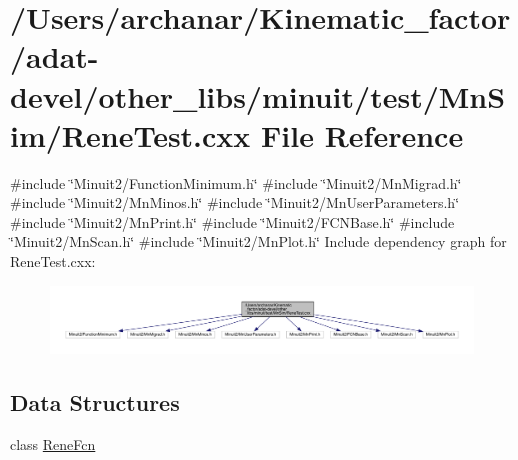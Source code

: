 \hypertarget{adat-devel_2other__libs_2minuit_2test_2MnSim_2ReneTest_8cxx}{}\section{/\+Users/archanar/\+Kinematic\+\_\+factor/adat-\/devel/other\+\_\+libs/minuit/test/\+Mn\+Sim/\+Rene\+Test.cxx File Reference}
\label{adat-devel_2other__libs_2minuit_2test_2MnSim_2ReneTest_8cxx}
{\ttfamily \#include \char`\"{}Minuit2/\+Function\+Minimum.\+h\char`\"{}}\newline
{\ttfamily \#include \char`\"{}Minuit2/\+Mn\+Migrad.\+h\char`\"{}}\newline
{\ttfamily \#include \char`\"{}Minuit2/\+Mn\+Minos.\+h\char`\"{}}\newline
{\ttfamily \#include \char`\"{}Minuit2/\+Mn\+User\+Parameters.\+h\char`\"{}}\newline
{\ttfamily \#include \char`\"{}Minuit2/\+Mn\+Print.\+h\char`\"{}}\newline
{\ttfamily \#include \char`\"{}Minuit2/\+F\+C\+N\+Base.\+h\char`\"{}}\newline
{\ttfamily \#include \char`\"{}Minuit2/\+Mn\+Scan.\+h\char`\"{}}\newline
{\ttfamily \#include \char`\"{}Minuit2/\+Mn\+Plot.\+h\char`\"{}}\newline
Include dependency graph for Rene\+Test.\+cxx\+:
\nopagebreak
\begin{figure}[H]
\begin{center}
\leavevmode
\includegraphics[width=350pt]{da/d42/adat-devel_2other__libs_2minuit_2test_2MnSim_2ReneTest_8cxx__incl}
\end{center}
\end{figure}
\subsection*{Data Structures}
\begin{DoxyCompactItemize}
\item 
class \mbox{\hyperlink{classReneFcn}{Rene\+Fcn}}
\end{DoxyCompactItemize}
